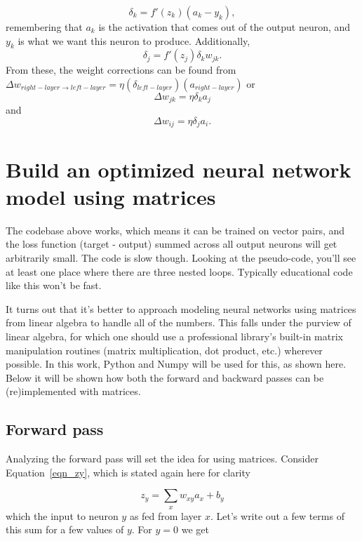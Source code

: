 \documentclass[12pt]{article}
\begin{document}
\begin{equation}
\delta_k=f'(z_k)(a_k-y_k),
\end{equation}
remembering that $a_k$ is the activation that comes out of the output neuron, and $y_k$ is what we want this neuron to produce. Additionally, 
\begin{equation}
\delta_j=f'(z_j)\delta_k w_{jk}.
\end{equation}
From these, the weight corrections can be found from $\Delta w_{right-layer\rightarrow left-layer}=\eta(\delta_{left-layer})(a_{right-layer})$ or
\begin{equation}
\Delta w_{jk}=\eta\delta_ka_j
\end{equation}
and
\begin{equation}
\Delta w_{ij}=\eta\delta_ja_i.
\end{equation}



\section{Build an optimized neural network model using matrices}

The codebase above works, which means it can be trained on vector pairs, and the loss function (target - output) summed across all output neurons will get arbitrarily small.  The code is slow though. Looking at the pseudo-code, you'll see at least one place where there are three nested loops.  Typically educational code like this won't be fast.

It turns out that it's better to approach modeling neural networks using matrices from linear algebra to handle all of the numbers. This falls under the purview of linear algebra, for which one should use a professional library's built-in matrix manipulation routines (matrix multiplication, dot product, etc.) wherever possible. In this work, Python and Numpy will be used for this, as shown here.  Below it will be shown how both the forward and backward passes can be (re)implemented with matrices.

\subsection{Forward pass}

Analyzing the forward pass will set the idea for using matrices.  Consider Equation~\ref{eqn_zy}, which is stated again here for clarity

\begin{equation}
z_{y}=\sum_x w_{xy} a_x + b_y
\end{equation}
which the input to neuron $y$ as fed from layer $x$. Let's write out a few terms of this sum for a few values of $y$. For $y=0$ we get
\end{document}
